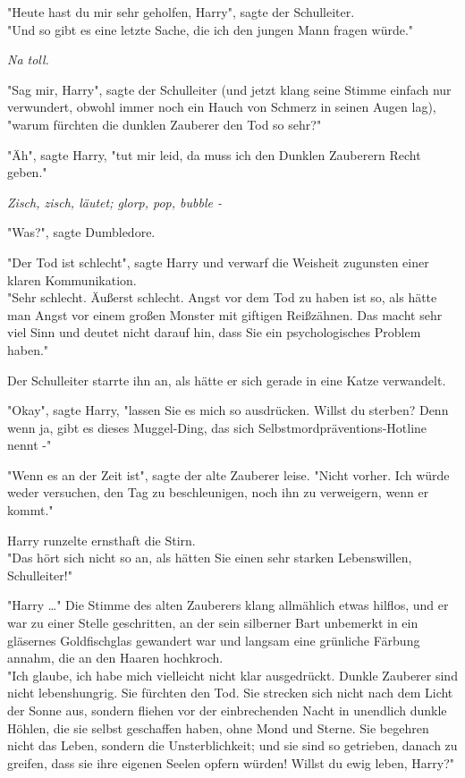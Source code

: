 {"Heute hast du mir sehr geholfen, Harry", sagte der Schulleiter.\\ "Und so gibt es eine letzte Sache, die ich den jungen Mann fragen würde."

\emph{Na toll.}

"Sag mir, Harry", sagte der Schulleiter (und jetzt klang seine Stimme einfach nur verwundert, obwohl immer noch ein Hauch von Schmerz in seinen Augen lag), "warum fürchten die dunklen Zauberer den Tod so sehr?"

"Äh", sagte Harry, "tut mir leid, da muss ich den Dunklen Zauberern Recht geben."

\emph{Zisch, zisch, läutet; glorp, pop, bubble -}

"Was?", sagte Dumbledore.

"Der Tod ist schlecht", sagte Harry und verwarf die Weisheit zugunsten einer klaren Kommunikation.\\ "Sehr schlecht. Äußerst schlecht. Angst vor dem Tod zu haben ist so, als hätte man Angst vor einem großen Monster mit giftigen Reißzähnen. Das macht sehr viel Sinn und deutet nicht darauf hin, dass Sie ein psychologisches Problem haben."

Der Schulleiter starrte ihn an, als hätte er sich gerade in eine Katze verwandelt.

"Okay", sagte Harry, "lassen Sie es mich so ausdrücken. Willst du sterben? Denn wenn ja, gibt es dieses Muggel-Ding, das sich Selbstmordpräventions-Hotline nennt -"

"Wenn es an der Zeit ist", sagte der alte Zauberer leise. "Nicht vorher. Ich würde weder versuchen, den Tag zu beschleunigen, noch ihn zu verweigern, wenn er kommt."

Harry runzelte ernsthaft die Stirn.\\ "Das hört sich nicht so an, als hätten Sie einen sehr starken Lebenswillen, Schulleiter!"

"Harry …" Die Stimme des alten Zauberers klang allmählich etwas hilflos, und er war zu einer Stelle geschritten, an der sein silberner Bart unbemerkt in ein gläsernes Goldfischglas gewandert war und langsam eine grünliche Färbung annahm, die an den Haaren hochkroch.\\ "Ich glaube, ich habe mich vielleicht nicht klar ausgedrückt. Dunkle Zauberer sind nicht lebenshungrig. Sie fürchten den Tod. Sie strecken sich nicht nach dem Licht der Sonne aus, sondern fliehen vor der einbrechenden Nacht in unendlich dunkle Höhlen, die sie selbst geschaffen haben, ohne Mond und Sterne. Sie begehren nicht das Leben, sondern die Unsterblichkeit; und sie sind so getrieben, danach zu greifen, dass sie ihre eigenen Seelen opfern würden! Willst du ewig leben, Harry?"

}
